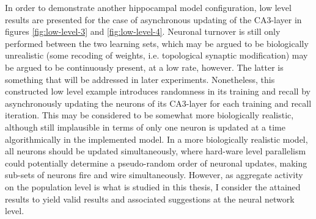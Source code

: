 In order to demonstrate another hippocampal model configuration, low level results are presented for the case of asynchronous updating of the CA3-layer in figures \ref{fig:low-level-3} and \ref{fig:low-level-4}. Neuronal turnover is still only performed between the two learning sets, which may be argued to be biologically unrealistic (some recoding of weights, i.e. topological synaptic modification) may be argued to be continuously present, at a low rate, however. The latter is something that will be addressed in later experiments. 
Nonetheless, this constructed low level example introduces randomness in its training and recall by asynchronously updating the neurons of its CA3-layer for each training and recall iteration. This may be considered to be somewhat more biologically realistic, although still implausible in terms of only one neuron is updated at a time algorithmically in the implemented model. In a more biologically realistic model, all neurons should be updated simultaneously, where hard-ware level parallelism could potentially determine a pseudo-random order of neuronal updates, making sub-sets of neurons fire and wire simultaneously. 
However, as aggregate activity on the population level is what is studied in this thesis, I consider the attained results to yield valid results and associated suggestions at the neural network level.

